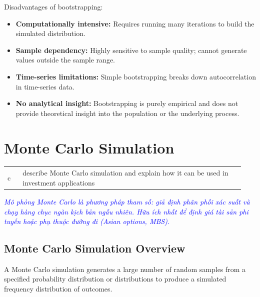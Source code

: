 Disadvantages of bootstrapping:
\begin{itemize}
	\item \textbf{Computationally intensive:} Requires running many iterations to build the simulated distribution.
	\item \textbf{Sample dependency:} Highly sensitive to sample quality; cannot generate values outside the sample range.
	\item \textbf{Time-series limitations:} Simple bootstrapping breaks down autocorrelation in time-series data.
	\item \textbf{No analytical insight:} Bootstrapping is purely empirical and does not provide theoretical insight into the population or the underlying process.
\end{itemize}


\section{Monte Carlo Simulation}
\label{sec:Monte Carlo Simulation}

\begin{center}
\begin{tabular}{p{0.06\linewidth} | p{0.88\linewidth}}
	c & describe Monte Carlo simulation and explain how it can be used in investment applications \\
\end{tabular}
\end{center}

\textcolor{blue}{\textit{Mô phỏng Monte Carlo là phương pháp tham số: giả định phân phối xác suất và chạy hàng chục ngàn kịch bản ngẫu nhiên. Hữu ích nhất để định giá tài sản phi tuyến hoặc phụ thuộc đường đi (Asian options, MBS).}}

\subsection{Monte Carlo Simulation Overview}
A Monte Carlo simulation generates a large number of random samples from a specified probability distribution or distributions to produce a simulated frequency distribution of outcomes.

